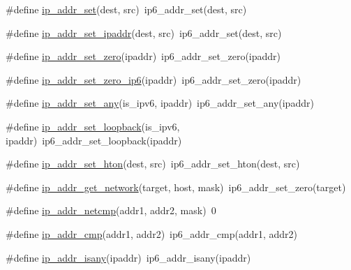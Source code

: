 \begin{DoxyCompactItemize}
\item 
\#define \hyperlink{openmote-cc2538_2lwip_2src_2include_2lwip_2ip__addr_8h_a40db7feae2b92f7a7a01d65a85b06e18}{ip\+\_\+addr\+\_\+set}(dest,  src)~ip6\+\_\+addr\+\_\+set(dest, src)
\item 
\#define \hyperlink{openmote-cc2538_2lwip_2src_2include_2lwip_2ip__addr_8h_aea5e4795598bc33fa2db1773c8e6fbac}{ip\+\_\+addr\+\_\+set\+\_\+ipaddr}(dest,  src)~ip6\+\_\+addr\+\_\+set(dest, src)
\item 
\#define \hyperlink{openmote-cc2538_2lwip_2src_2include_2lwip_2ip__addr_8h_aae7edb585c062ae03bfbd3af7bf671bc}{ip\+\_\+addr\+\_\+set\+\_\+zero}(ipaddr)~ip6\+\_\+addr\+\_\+set\+\_\+zero(ipaddr)
\item 
\#define \hyperlink{openmote-cc2538_2lwip_2src_2include_2lwip_2ip__addr_8h_afb3a0e5241683aff573e195f31ba8845}{ip\+\_\+addr\+\_\+set\+\_\+zero\+\_\+ip6}(ipaddr)~ip6\+\_\+addr\+\_\+set\+\_\+zero(ipaddr)
\item 
\#define \hyperlink{openmote-cc2538_2lwip_2src_2include_2lwip_2ip__addr_8h_a8853fce54b1816dca3af90b48677e673}{ip\+\_\+addr\+\_\+set\+\_\+any}(is\+\_\+ipv6,  ipaddr)~ip6\+\_\+addr\+\_\+set\+\_\+any(ipaddr)
\item 
\#define \hyperlink{openmote-cc2538_2lwip_2src_2include_2lwip_2ip__addr_8h_a8f9d56ac85cd87338a1823e4a58ba1da}{ip\+\_\+addr\+\_\+set\+\_\+loopback}(is\+\_\+ipv6,  ipaddr)~ip6\+\_\+addr\+\_\+set\+\_\+loopback(ipaddr)
\item 
\#define \hyperlink{openmote-cc2538_2lwip_2src_2include_2lwip_2ip__addr_8h_a3528798be1d2f1ec6a6bccd35694edce}{ip\+\_\+addr\+\_\+set\+\_\+hton}(dest,  src)~ip6\+\_\+addr\+\_\+set\+\_\+hton(dest, src)
\item 
\#define \hyperlink{openmote-cc2538_2lwip_2src_2include_2lwip_2ip__addr_8h_a535520cd0a0d08a4c4c29b331c55830f}{ip\+\_\+addr\+\_\+get\+\_\+network}(target,  host,  mask)~ip6\+\_\+addr\+\_\+set\+\_\+zero(target)
\item 
\#define \hyperlink{openmote-cc2538_2lwip_2src_2include_2lwip_2ip__addr_8h_a3a2123f0bbf6fe843c8542e349c680eb}{ip\+\_\+addr\+\_\+netcmp}(addr1,  addr2,  mask)~0
\item 
\#define \hyperlink{openmote-cc2538_2lwip_2src_2include_2lwip_2ip__addr_8h_a008c9c92d770cc030ea054e6b259835a}{ip\+\_\+addr\+\_\+cmp}(addr1,  addr2)~ip6\+\_\+addr\+\_\+cmp(addr1, addr2)
\item 
\#define \hyperlink{openmote-cc2538_2lwip_2src_2include_2lwip_2ip__addr_8h_a279118890e6a90aa740051fb8b0cc5f4}{ip\+\_\+addr\+\_\+isany}(ipaddr)~ip6\+\_\+addr\+\_\+isany(ipaddr)

\end{DoxyCompactItemize}
